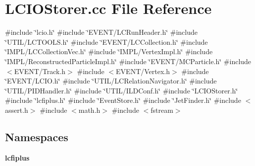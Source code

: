 \section{L\+C\+I\+O\+Storer.\+cc File Reference}
\label{LCIOStorer_8cc}
{\ttfamily \#include \char`\"{}lcio.\+h\char`\"{}}\newline
{\ttfamily \#include \char`\"{}E\+V\+E\+N\+T/\+L\+C\+Run\+Header.\+h\char`\"{}}\newline
{\ttfamily \#include \char`\"{}U\+T\+I\+L/\+L\+C\+T\+O\+O\+L\+S.\+h\char`\"{}}\newline
{\ttfamily \#include \char`\"{}E\+V\+E\+N\+T/\+L\+C\+Collection.\+h\char`\"{}}\newline
{\ttfamily \#include \char`\"{}I\+M\+P\+L/\+L\+C\+Collection\+Vec.\+h\char`\"{}}\newline
{\ttfamily \#include \char`\"{}I\+M\+P\+L/\+Vertex\+Impl.\+h\char`\"{}}\newline
{\ttfamily \#include \char`\"{}I\+M\+P\+L/\+Reconstructed\+Particle\+Impl.\+h\char`\"{}}\newline
{\ttfamily \#include \char`\"{}E\+V\+E\+N\+T/\+M\+C\+Particle.\+h\char`\"{}}\newline
{\ttfamily \#include $<$E\+V\+E\+N\+T/\+Track.\+h$>$}\newline
{\ttfamily \#include $<$E\+V\+E\+N\+T/\+Vertex.\+h$>$}\newline
{\ttfamily \#include \char`\"{}E\+V\+E\+N\+T/\+L\+C\+I\+O.\+h\char`\"{}}\newline
{\ttfamily \#include \char`\"{}U\+T\+I\+L/\+L\+C\+Relation\+Navigator.\+h\char`\"{}}\newline
{\ttfamily \#include \char`\"{}U\+T\+I\+L/\+P\+I\+D\+Handler.\+h\char`\"{}}\newline
{\ttfamily \#include \char`\"{}U\+T\+I\+L/\+I\+L\+D\+Conf.\+h\char`\"{}}\newline
{\ttfamily \#include \char`\"{}L\+C\+I\+O\+Storer.\+h\char`\"{}}\newline
{\ttfamily \#include \char`\"{}lcfiplus.\+h\char`\"{}}\newline
{\ttfamily \#include \char`\"{}Event\+Store.\+h\char`\"{}}\newline
{\ttfamily \#include \char`\"{}Jet\+Finder.\+h\char`\"{}}\newline
{\ttfamily \#include $<$assert.\+h$>$}\newline
{\ttfamily \#include $<$math.\+h$>$}\newline
{\ttfamily \#include $<$fstream$>$}\newline
\subsection*{Namespaces}
\begin{DoxyCompactItemize}
\item 
 \textbf{ lcfiplus}
\end{DoxyCompactItemize}
